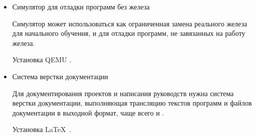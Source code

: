\begin{itemize}
  \item Симулятор для отладки программ без железа
  
  Симулятор может использоваться как ограниченная замена реального железа
  для начального обучения, и для отладки программ, не завязанных на работу
  железа.
  
  Установка QEMU .
  
  \item Система верстки документации
  
  Для документирования проектов и написания руководств нужна система верстки
  документации, выполняющая трансляцию текстов программ и файлов 
  документации в выходной формат, чаще всего  и .
  
  Установка \LaTeX\ .
  
\end{itemize}

